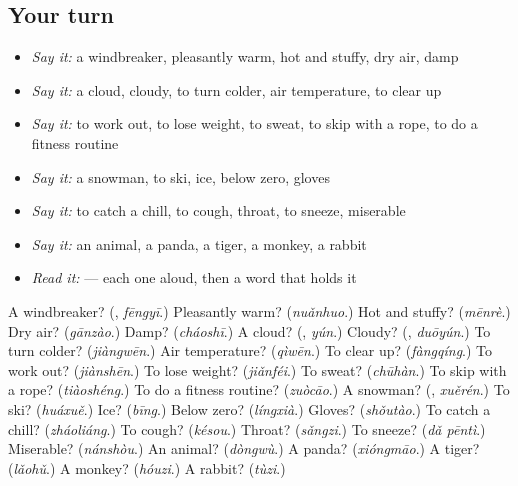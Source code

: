 \subsection*{Your turn}
\begin{itemize}
\raggedright
  \item \emph{Say it:} a windbreaker, pleasantly warm, hot and stuffy, dry air, damp
  \item \emph{Say it:} a cloud, cloudy, to turn colder, air temperature, to clear up
  \item \emph{Say it:} to work out, to lose weight, to sweat, to skip with a rope, to do a fitness routine
  \item \emph{Say it:} a snowman, to ski, ice, below zero, gloves
  \item \emph{Say it:} to catch a chill, to cough, throat, to sneeze, miserable
  \item \emph{Say it:} an animal, a panda, a tiger, a monkey, a rabbit
  \item \emph{Read it:}    — each one aloud, then a word that holds it
\end{itemize}

\begin{tcolorbox}[breakable,colback=teal!4,colframe=teal!35!black,title={Before you move on}]
A windbreaker? (\textbf{}, \emph{fēngyī}.) Pleasantly warm? (\emph{nuǎnhuo}.) Hot and stuffy? (\emph{mēnrè}.) Dry air? (\emph{gānzào}.) Damp? (\emph{cháoshī}.) A cloud? (\textbf{}, \emph{yún}.) Cloudy? (\textbf{}, \emph{duōyún}.) To turn colder? (\emph{jiàngwēn}.) Air temperature? (\emph{qìwēn}.) To clear up? (\emph{fàngqíng}.) To work out? (\emph{jiànshēn}.) To lose weight? (\emph{jiǎnféi}.) To sweat? (\emph{chūhàn}.) To skip with a rope? (\emph{tiàoshéng}.) To do a fitness routine? (\emph{zuòcāo}.) A snowman? (\textbf{}, \emph{xuěrén}.) To ski? (\emph{huáxuě}.) Ice? (\emph{bīng}.) Below zero? (\emph{língxià}.) Gloves? (\emph{shǒutào}.) To catch a chill? (\emph{zháoliáng}.) To cough? (\emph{késou}.) Throat? (\emph{sǎngzi}.) To sneeze? (\emph{dǎ pēntì}.) Miserable? (\emph{nánshòu}.) An animal? (\emph{dòngwù}.) A panda? (\emph{xióngmāo}.) A tiger? (\emph{lǎohǔ}.) A monkey? (\emph{hóuzi}.) A rabbit? (\emph{tùzi}.)
\end{tcolorbox}
